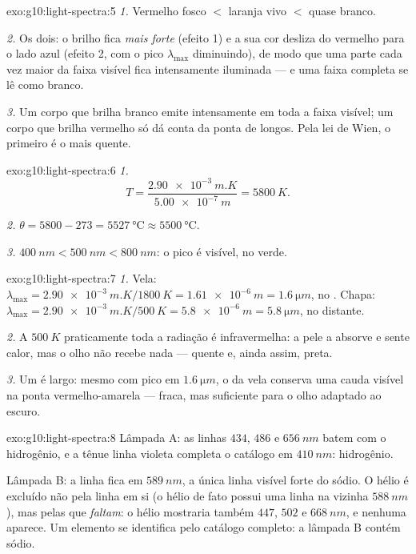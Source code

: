 \begin{solution}{exo:g10:light-spectra:5}
\emph{1.} Vermelho fosco $<$ laranja vivo $<$ quase branco.

\emph{2.} Os dois: o brilho fica \emph{mais forte} (efeito 1) e a sua cor
desliza do vermelho para o lado azul (efeito 2, com o pico $\lambda_{\max}$
diminuindo), de modo que uma parte cada vez maior da faixa visível fica
intensamente iluminada --- e uma faixa completa se lê como branco.

\emph{3.} Um corpo que brilha branco emite intensamente em toda a faixa
visível; um corpo que brilha vermelho só dá conta da ponta de  longos. Pela lei de Wien, o primeiro é o mais quente.
\end{solution}

\begin{solution}{exo:g10:light-spectra:6}
\emph{1.}
\[
T = \frac{\qty{2.90e-3}{m.K}}{\qty{5.00e-7}{m}} = \qty{5800}{K}.
\]

\emph{2.} $\theta = 5800 - 273 = \qty{5527}{\degreeCelsius} \approx
\qty{5500}{\degreeCelsius}$.

\emph{3.} $\qty{400}{nm} < \qty{500}{nm} < \qty{800}{nm}$: o pico é visível,
no verde.
\end{solution}

\begin{solution}{exo:g10:light-spectra:7}
\emph{1.} Vela:
$\lambda_{\max} = \qty{2.90e-3}{m.K} / \qty{1800}{K} = \qty{1.61e-6}{m}
= \qty{1.6}{\micro m}$, no . Chapa:
$\lambda_{\max} = \qty{2.90e-3}{m.K} / \qty{500}{K} = \qty{5.8e-6}{m}
= \qty{5.8}{\micro m}$, no  distante.

\emph{2.} A $\qty{500}{K}$ praticamente toda a radiação é infravermelha: a
pele a absorve e sente calor, mas o olho não recebe nada --- quente e, ainda
assim, preta.

\emph{3.} Um  é largo: mesmo com pico em
$\qty{1.6}{\micro m}$, o  da vela conserva uma cauda visível na
ponta vermelho-amarela --- fraca, mas suficiente para o olho adaptado ao
escuro.
\end{solution}

\begin{solution}{exo:g10:light-spectra:8}
Lâmpada A: as linhas $434$, $486$ e $\qty{656}{nm}$ batem com o hidrogênio,
e a tênue linha violeta completa o catálogo em $\qty{410}{nm}$: hidrogênio.

Lâmpada B: a linha fica em $\qty{589}{nm}$, a única linha visível forte do
sódio. O hélio é excluído não pela linha em si (o hélio de fato possui uma
linha na vizinha $\qty{588}{nm}$), mas pelas que \emph{faltam}: o hélio
mostraria também $447$, $502$ e $\qty{668}{nm}$, e nenhuma aparece. Um
elemento se identifica pelo catálogo completo: a lâmpada B contém sódio.
\end{solution}

